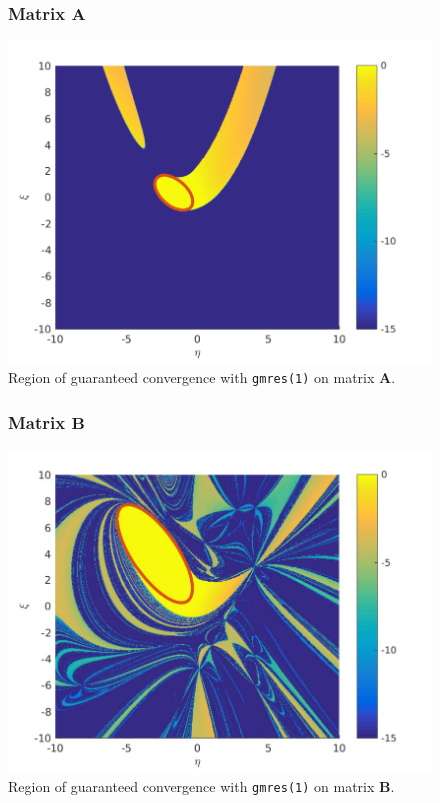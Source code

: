 \begin{frame}
\begin{figure}
\frametitle{Matrix $\mathbf{A}$}
\centering
\includegraphics[width=0.7\linewidth]{../images/gmresOneConvA}
\caption{Region of guaranteed convergence with \texttt{gmres(1)} on matrix $\mathbf{A}$.}
\label{fig:gmresOneConvA}
\end{figure}
\end{frame}

\begin{frame}
\begin{figure}
\frametitle{Matrix $\mathbf{B}$}
\centering
\includegraphics[width=0.7\linewidth]{../images/gmresOneConvB}
\caption{Region of guaranteed convergence with \texttt{gmres(1)} on matrix $\mathbf{B}$.}
\label{fig:gmresOneConvB}
\end{figure}
\end{frame}


